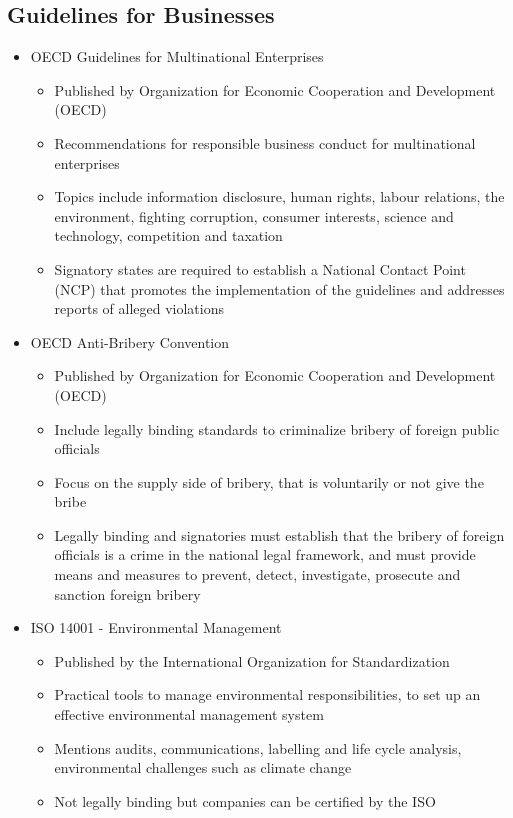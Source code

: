 \documentclass[11pt]{article}
\theoremstyle{definition}
\begin{document}
\subsection{Guidelines for Businesses}
\begin{itemize}
	\item OECD Guidelines for Multinational Enterprises
	\begin{itemize}
		\item Published by Organization for Economic Cooperation and Development (OECD)
		\item Recommendations for responsible business conduct for multinational enterprises
		\item Topics include information disclosure, human rights, labour relations, the environment, fighting corruption, consumer interests, science and technology, competition and taxation
		\item Signatory states are required to establish a National Contact Point (NCP) that promotes the implementation of the guidelines and addresses reports of alleged violations
	\end{itemize}
	\item OECD Anti-Bribery Convention
	\begin{itemize}
		\item Published by Organization for Economic Cooperation and Development (OECD)
		\item Include legally binding standards to criminalize bribery of foreign public officials
		\item Focus on the supply side of bribery, that is voluntarily or not give the bribe
		\item Legally binding and signatories must establish that the bribery of foreign officials is a crime in the national legal framework, and must provide means and measures to prevent, detect, investigate, prosecute and sanction foreign bribery
	\end{itemize}
	\item ISO 14001 - Environmental Management
	\begin{itemize}
		\item Published by the International Organization for Standardization
		\item Practical tools to manage environmental responsibilities, to set up an effective environmental management system
		\item Mentions audits, communications, labelling and life cycle analysis, environmental challenges such as climate change
		\item Not legally binding but companies can be certified by the ISO

\end{itemize}
\end{itemize}
\end{document}

